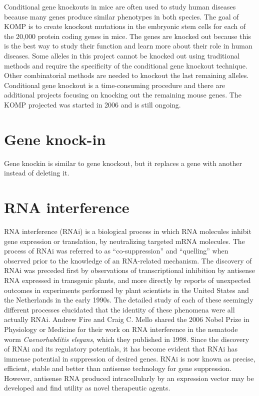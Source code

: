 Conditional gene knockouts in mice are often used to study human diseases because many genes produce similar phenotypes in both species. The goal of KOMP is to create knockout mutations in the embryonic stem cells for each of the 20,000 protein coding genes in mice. The genes are knocked out because this is the best way to study their function and learn more about their role in human diseases. Some alleles in this project cannot be knocked out using traditional methods and require the specificity of the conditional gene knockout technique. Other combinatorial methods are needed to knockout the last remaining alleles. Conditional gene knockout is a time-consuming procedure and there are additional projects focusing on knocking out the remaining mouse genes. The KOMP projected was started in 2006 and is still ongoing.

\hypertarget{gene-knock-in}{%
\section{Gene knock-in}\label{gene-knock-in}}

Gene knockin is similar to gene knockout, but it replaces a gene with another instead of deleting it.

\hypertarget{rna-interference}{%
\section{RNA interference}\label{rna-interference}}

RNA interference (RNAi) is a biological process in which RNA molecules inhibit gene expression or translation, by neutralizing targeted mRNA molecules. The process of RNAi was referred to as ``co-suppression'' and ``quelling'' when observed prior to the knowledge of an RNA-related mechanism. The discovery of RNAi was preceded first by observations of transcriptional inhibition by antisense RNA expressed in transgenic plants, and more directly by reports of unexpected outcomes in experiments performed by plant scientists in the United States and the Netherlands in the early 1990s. The detailed study of each of these seemingly different processes elucidated that the identity of these phenomena were all actually RNAi. Andrew Fire and Craig C. Mello shared the 2006 Nobel Prize in Physiology or Medicine for their work on RNA interference in the nematode worm \emph{Caenorhabditis elegans}, which they published in 1998. Since the discovery of RNAi and its regulatory potentials, it has become evident that RNAi has immense potential in suppression of desired genes. RNAi is now known as precise, efficient, stable and better than antisense technology for gene suppression. However, antisense RNA produced intracellularly by an expression vector may be developed and find utility as novel therapeutic agents.

